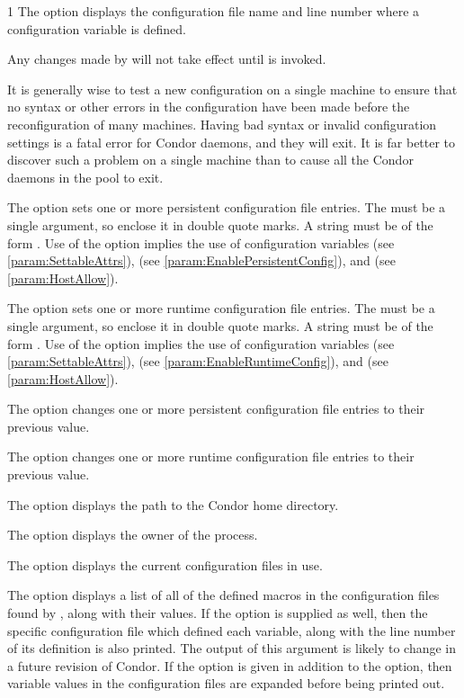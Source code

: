 \begin{ManPage}{\label{man-condor-config-val}}{1}
The  option displays the configuration
file name and line number where a configuration variable is defined.

Any changes made by  will not take effect
until  is invoked.

It is generally wise to test a new configuration on a single
machine to ensure that no syntax or other errors in the
configuration have been made before the reconfiguration of many machines.  
Having bad syntax or invalid configuration settings is a fatal error
for Condor daemons, and they will exit.
It is far better to discover such a problem on a single machine than to
cause all the Condor daemons in the pool to exit.

The  option sets one or more persistent configuration file entries.
The  must be a single argument, so enclose it in double quote marks.
A string must be of the form .
Use of the  option implies the use of configuration variables
 (see \ref{param:SettableAttrs}),
 (see \ref{param:EnablePersistentConfig}),
and  (see \ref{param:HostAllow}).

The  option sets one or more runtime configuration file entries.
The  must be a single argument, so enclose it in double quote marks.
A string must be of the form .
Use of the  option implies the use of configuration variables
 (see \ref{param:SettableAttrs}),
 (see \ref{param:EnableRuntimeConfig}),
and  (see \ref{param:HostAllow}).

The  option changes one or more persistent configuration file
entries to their previous value.

The  option changes one or more runtime configuration file
entries to their previous value.

The  option displays the path to the Condor home directory.

The  option displays the owner of the  process.

The  option displays the current configuration files in use.

The  option displays a list of all of the defined macros
in the configuration files found by , along with
their values. If the  option is supplied as well,
then the specific configuration file which defined each variable,
along with the line number of its definition is also printed. 
\Note The output of this argument is likely to change 
in a future revision of Condor.
If the  option is given in addition to the  option,
then variable values in the configuration files are expanded before
being printed out.


\end{ManPage}
